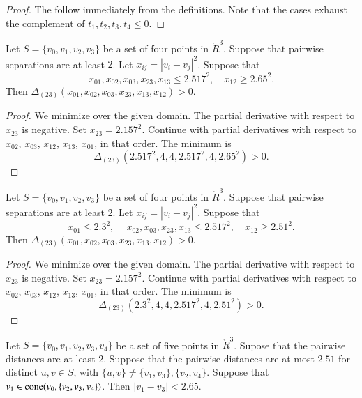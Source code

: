 \begin{proof}
The follow immediately from the definitions.
Note that the cases exhaust the complement of $t_1,t_2,t_3,t_4\le 0$.
\end{proof}

\newpage




\begin{lemma}
Let $S=\{v_0,v_1,v_2,v_3\}$ be a set of four
points in $\ring{R}^3$.  Suppose that pairwise separations
are at least $2$. 
Let $x_{ij}=|v_i-v_j|^2$.
 Suppose that
$$
x_{01},x_{02},x_{03},x_{23},x_{13}\le 2.517^2,\quad x_{12}\ge 2.65^2.
$$
Then $\Delta_{(23)}(x_{01},x_{02},x_{03},x_{23},x_{13},x_{12})>0$.
\end{lemma}

\begin{proof} We minimize over the given domain.
The partial derivative with respect to $x_{23}$ is negative.
Set $x_{23}=2.157^2$.  Continue with partial derivatives with
respect to $x_{02}$, $x_{03}$, $x_{12}$, $x_{13}$, $x_{01}$, in that order.
The minimum is
$$\Delta_{(23)}(2.517^2,4,4,2.517^2,4,2.65^2) >0.$$ 
\end{proof}

\newpage

\begin{lemma}
Let $S=\{v_0,v_1,v_2,v_3\}$ be a set of four
points in $\ring{R}^3$.  Suppose that pairwise separations
are at least $2$. 
Let $x_{ij}=|v_i-v_j|^2$.
 Suppose that
$$
x_{01}\le 2.3^2,\
\quad x_{02},x_{03},x_{23},x_{13}\le 2.517^2,\quad x_{12}\ge 2.51^2.
$$
Then $\Delta_{(23)}(x_{01},x_{02},x_{03},x_{23},x_{13},x_{12})>0$.
\end{lemma}

\begin{proof} We minimize over the given domain.
The partial derivative with respect to $x_{23}$ is negative.
Set $x_{23}=2.157^2$.  Continue with partial derivatives with
respect to $x_{02}$, $x_{03}$, $x_{12}$, $x_{13}$, $x_{01}$, in that order.
The minimum is
$$\Delta_{(23)}(2.3^2,4,4,2.517^2,4,2.51^2) >0.$$ 
\end{proof}

\newpage

\begin{lemma}\label{tarski:flat-then-convexq}
Let $S=\{v_0,v_1,v_2,v_3,v_4\}$ be a set of
five points in $\ring{R}^3$.  Supose that the pairwise
distances are at least $2$.  Suppose that the pairwise
distances are at most $2.51$ for distinct $u,v\in S$, with
$\{u,v\}\ne \{v_1,v_3\}, \{v_2,v_4\}$.
Suppose that $v_1\in{\operatorname{cone}}(v_0,\{v_2,v_3,v_4\})$.
Then $|v_1-v_3|< 2.65$.  
\end{lemma}


